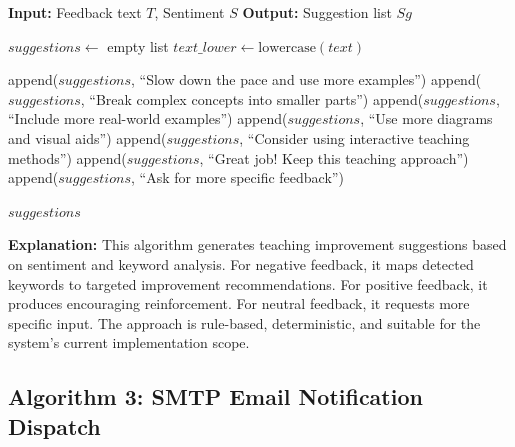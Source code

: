\begin{algorithm}[H]
\caption{AI Suggestion Generation}
\begin{algorithmic}[1]

\State \textbf{Input:} Feedback text $T$, Sentiment $S$
\State \textbf{Output:} Suggestion list $Sg$

    \State $suggestions \gets$ empty list
    \State $text\_lower \gets \text{lowercase}(text)$
    
            \State append($suggestions$, ``Slow down the pace and use more examples'')
        \EndIf
            \State append($suggestions$, ``Break complex concepts into smaller parts'')
        \EndIf
            \State append($suggestions$, ``Include more real-world examples'')
        \EndIf
            \State append($suggestions$, ``Use more diagrams and visual aids'')
        \EndIf
            \State append($suggestions$, ``Consider using interactive teaching methods'')
        \EndIf
        \State append($suggestions$, ``Great job! Keep this teaching approach'')
    \Else
        \State append($suggestions$, ``Ask for more specific feedback'')
    \EndIf
    
    \State \Return $suggestions$
\EndFunction

\end{algorithmic}
\end{algorithm}

\textbf{Explanation:}
This algorithm generates teaching improvement suggestions based on sentiment and keyword analysis. For negative feedback, it maps detected keywords to targeted improvement recommendations. For positive feedback, it produces encouraging reinforcement. For neutral feedback, it requests more specific input. The approach is rule-based, deterministic, and suitable for the system's current implementation scope.

\subsection{Algorithm 3: SMTP Email Notification Dispatch}

